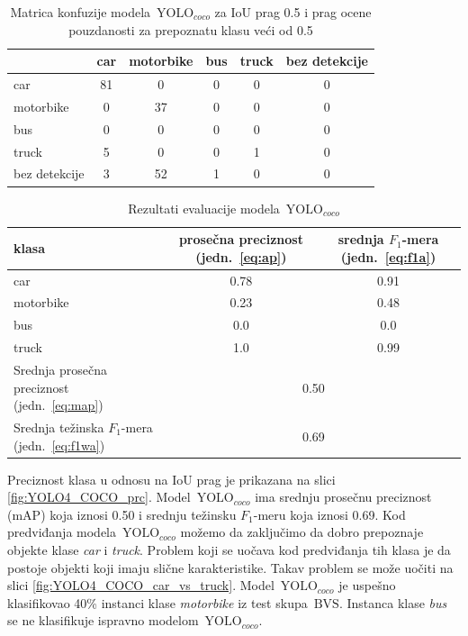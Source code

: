 \documentclass[12pt,oneside]{memoir}
\newcommand{\yolo}{\ensuremath{\,\textrm{YOLO}}}
\newcommand{\bvs}{\ensuremath{\,\textrm{BVS}}}
\begin{document}
\begin{table}[htb]
    \begin{center}
    \caption{Matrica konfuzije modela $\yolo_{coco}$ za IoU prag 0.5 i prag ocene pouzdanosti za prepoznatu klasu veći od 0.5 }
    \begin{tabular}{ l|c|c|c|c|c|}
                  & car  & motorbike & bus & truck & bez detekcije \\ \hline
    car           & 81   & 0         & 0   & 0     & 0             \\ 
    motorbike     & 0    & 37        & 0   & 0     & 0             \\ 
    bus           & 0    & 0         & 0   & 0     & 0             \\ 
    truck         & 5    & 0         & 0   & 1     & 0             \\ 
    bez detekcije & 3    & 52        & 1   & 0     & 0             \\ \hline
    \hline
    \end{tabular}
    \label{tab:YOLO4_COCO_confusion_mat}
    \end{center}
\end{table}


\begin{table}[htb]
    \begin{center}
    \caption{Rezultati evaluacije modela $\yolo_{coco}$}
        \begin{tabular}{|m{10em}|c|c|}
        \toprule
        klasa     & prosečna preciznost (jedn.~\ref{eq:ap}) & srednja $F_1$-mera (jedn.~\ref{eq:f1a})  \\ \hline
        \midrule
        car       & 0.78  & 0.91 \\ \hline
        motorbike & 0.23  & 0.48 \\ \hline
        bus       & 0.0   & 0.0  \\ \hline
        truck     & 1.0   & 0.99 \\ \hline
        \bottomrule
        Srednja prosečna preciznost (jedn.~\ref{eq:map}) & \multicolumn{2}{c|}{0.50}  \\ \hline
        Srednja težinska $F_1$-mera (jedn.~\ref{eq:f1wa}) & \multicolumn{2}{c|}{0.69}  \\ \hline
    \end{tabular}
    \label{tab:YOLO4_COCO_results}
    \end{center}
\end{table}

\clearpage
Preciznost klasa u odnosu na IoU prag je prikazana na slici \ref{fig:YOLO4_COCO_prc}. Model $\yolo_{coco}$ ima srednju prosečnu preciznost (mAP) koja iznosi 0.50 i srednju težinsku $F_1$-meru koja iznosi 0.69. Kod predviđanja modela $\yolo_{coco}$ možemo da zaključimo da dobro prepoznaje objekte klase \textit{car} i \textit{truck}. Problem koji se uočava kod predviđanja tih klasa je da postoje objekti koji imaju slične karakteristike. Takav problem se može uočiti na slici \ref{fig:YOLO4_COCO_car_vs_truck}. Model $\yolo_{coco}$ je uspešno klasifikovao 40\% instanci klase \textit{motorbike} iz test skupa \bvs. Instanca klase \textit{bus} se ne klasifikuje ispravno modelom  $\yolo_{coco}$.
\end{document}
